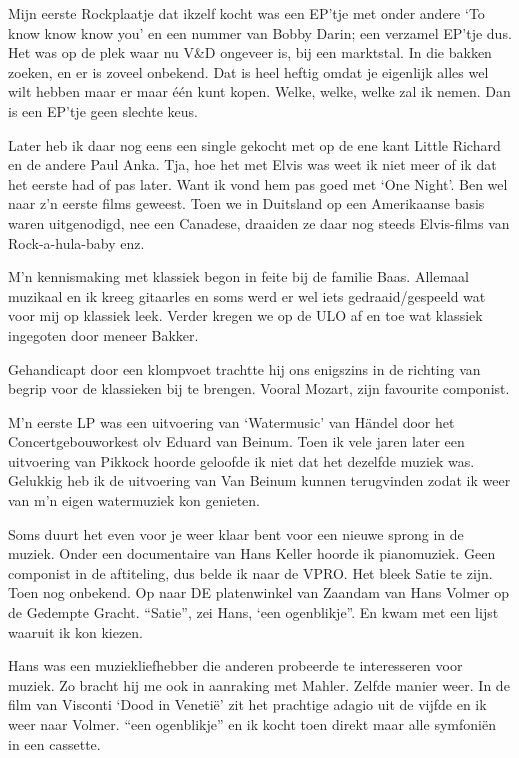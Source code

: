 \documentclass[10pt,twoside,openright]{memoir}
\begin{document}
Mijn eerste Rockplaatje dat ikzelf kocht was een EP'tje met onder andere `To know know know you' en een nummer van Bobby Darin; een verzamel EP'tje dus. Het was op de plek waar nu V\&D ongeveer is, bij een marktstal. In die bakken zoeken, en er is zoveel onbekend. Dat is heel heftig omdat je eigenlijk alles wel wilt hebben maar er maar één kunt kopen. Welke, welke, welke zal ik nemen. Dan is een EP'tje geen slechte keus.

Later heb ik daar nog eens een single gekocht met op de ene kant Little Richard en de andere Paul Anka. Tja, hoe het met Elvis was weet ik niet meer of ik dat het eerste had of pas later. Want ik vond hem pas goed met `One Night'. Ben wel naar z'n eerste films geweest. Toen we in Duitsland op een Amerikaanse basis waren uitgenodigd, nee een Canadese, draaiden ze daar nog steeds Elvis-films van Rock-a-hula-baby enz.

M’n kennismaking met klassiek begon in feite bij de familie Baas. Allemaal muzikaal en ik kreeg gitaarles en soms werd er wel iets gedraaid/gespeeld wat voor mij op klassiek leek. Verder kregen we op de ULO af en toe wat klassiek ingegoten door meneer Bakker. 

Gehandicapt door een klompvoet trachtte hij ons enigszins in de richting van begrip voor de klassieken bij te brengen. Vooral Mozart, zijn favourite componist.

M’n eerste LP was een uitvoering van ‘Watermusic’ van Händel door het Concertgebouworkest olv Eduard van Beinum. Toen ik vele jaren later een uitvoering van Pikkock hoorde geloofde ik niet dat het dezelfde muziek was. Gelukkig heb ik de uitvoering van Van Beinum kunnen terugvinden zodat ik weer van m’n eigen watermuziek kon genieten. 

Soms duurt het even voor je weer klaar bent voor een nieuwe sprong in de muziek. Onder een documentaire van Hans Keller hoorde ik pianomuziek. Geen componist in de aftiteling, dus belde ik naar de VPRO. Het bleek Satie te zijn. Toen nog onbekend. Op naar DE platenwinkel van Zaandam van Hans Volmer op de Gedempte Gracht. “Satie”, zei Hans, ‘een ogenblikje”. En kwam met een lijst waaruit ik kon kiezen. 

Hans was een muziekliefhebber die anderen probeerde te interesseren voor muziek. Zo bracht hij me ook in aanraking met Mahler. Zelfde manier weer. In de film van Visconti ‘Dood in Venetië’ zit het prachtige adagio uit de vijfde en ik weer naar Volmer. “een ogenblikje” en ik kocht toen direkt maar alle symfoniën in een cassette.
\end{document}
